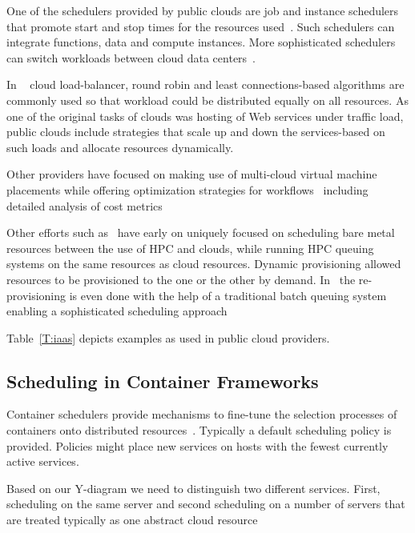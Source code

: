 \documentclass[final,5p,times,twocolumn]{elsarticle}
\begin{document}
One of the schedulers provided by public clouds are job and instance
schedulers that promote start and stop times for the resources
used~\cite{AWSIns2019,AzureSch2019,Rackspace2016,GoogleAppEngine2018}. Such
schedulers can integrate functions, data and compute instances. More
sophisticated schedulers can switch workloads between cloud data
centers~\cite{MicrosoftAzure2014}.

In ~\cite{Rackspace2016} cloud load-balancer, round robin and least
connections-based algorithms are commonly used so that workload could
be distributed equally on all resources.  As one of the original tasks
of clouds was hosting of Web services under traffic load, public
clouds include strategies that scale up and down the services-based on
such loads and allocate resources dynamically.

Other providers have focused on making use of multi-cloud virtual
machine placements while offering optimization strategies for
workflows~\cite{CloudSigma2016} including detailed analysis of cost
metrics~\cite{Cloudmetrics2019}

Other efforts such as~\cite{las12fg-bookchapter,fox2013futuregrid}
have early on uniquely focused on scheduling bare metal resources
between the use of HPC and clouds, while running HPC queuing systems
on the same resources as cloud resources. Dynamic provisioning allowed
resources to be provisioned to the one or the other by
demand. In~\cite{las-comet} the re-provisioning is even done with the
help of a traditional batch queuing system enabling a sophisticated
scheduling approach

Table~\ref{T:iaas} depicts examples as used in public cloud providers.






\subsection{Scheduling in Container Frameworks}
\label{sec:container}


Container schedulers provide mechanisms to fine-tune the selection
processes of containers onto distributed
resources~\cite{Containers2018,de2018distributed}. Typically a default
scheduling policy is provided. Policies might place new services on
hosts with the fewest currently active services.

Based on our Y-diagram we need to distinguish two different
services. First, scheduling on the same server and second scheduling
on a number of servers that are treated typically as one abstract
cloud resource
\end{document}
